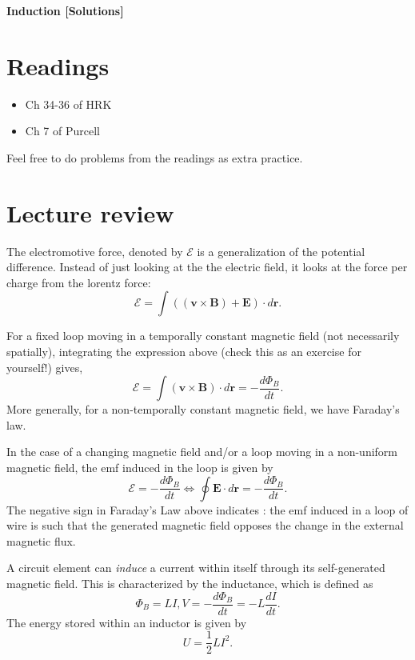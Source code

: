 \documentclass[11pt]{scrartcl}
\title{\titlee}
\author{Cambridge Physics Academy}
\date{2023-2024}
\newcommand{\titlee}{Induction [Solutions]}
\begin{document}
\thispagestyle{empty}
\begin{center}
    
    
    \Huge \textbf{\textsf{\titlee}}

    \large \theauthor
\end{center}

\setcounter{section}{-1}
\section{Readings}
\begin{itemize}
    \item Ch 34-36 of HRK
    \item Ch 7 of Purcell
\end{itemize}
Feel free to do problems from the readings as extra practice.


\section{Lecture review}

\begin{defn}
    The electromotive force, denoted by $\mathcal E$ is a generalization of the potential difference. Instead of just looking at the the electric field, it looks at the force per charge from the lorentz force:
    $$\mathcal E = \int ((\mathbf v \times \mathbf B) + \mathbf E )\cdot d\mathbf r.$$
\end{defn}
For a fixed loop moving in a temporally constant magnetic field (not necessarily spatially), integrating the expression above (check this as an exercise for yourself!) gives,
$$\mathcal E = \int (\mathbf v \times \mathbf B) \cdot d\mathbf r = -\frac{d\Phi_B}{dt}.$$
More generally, for a non-temporally constant magnetic field, we have Faraday's law.

\begin{theorem}
    In the case of a changing magnetic field and/or a loop moving in a non-uniform magnetic field, the emf induced in the loop is given by
    $$\mathcal E = -\frac{d\Phi_B}{dt} \iff \oint \mathbf E \cdot d\mathbf r = -\frac{d\Phi_B}{dt}.$$
The negative sign in Faraday's Law above indicates : the emf induced in a loop of wire is such that the generated magnetic field opposes the change in the external magnetic flux.
\end{theorem}

\begin{defn}
    A circuit element can \textit{induce} a current within itself through its self-generated magnetic field. This is characterized by the inductance, which is defined as
    $$\Phi_B = LI, V = -\frac{d\Phi_B}{dt}  =-L\frac{dI}{dt}.$$
    The energy stored within an inductor is given by
    $$U = \frac 12 LI^2.$$
\end{defn}
\end{document}
